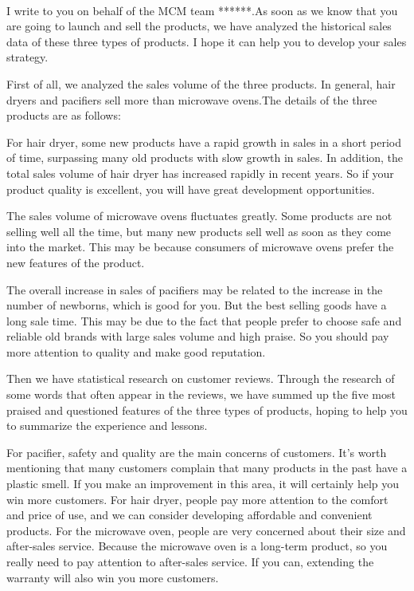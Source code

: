\documentclass{mcmthesis}
\begin{document}
	\paragraph{}
	I write to you on behalf of the MCM team ******.As soon as we know that you are going to launch and sell the products, we have analyzed the historical sales data of these three types of products. I hope it can help you to develop your sales strategy.
	
	First of all, we analyzed the sales volume of the three products. 
	In general, hair dryers and pacifiers sell more than microwave ovens.The details of the three products are as follows:
	
	For hair dryer, some new products have a rapid growth in sales in a short period of time, surpassing many old products with slow growth in sales. In addition, the total sales volume of hair dryer has increased rapidly in recent years. So if your product quality is excellent, you will have great development opportunities. 
	
	The sales volume of microwave ovens fluctuates greatly. Some products are not selling well all the time, but many new products sell well as soon as they come into the market. This may be because consumers of microwave ovens prefer the new features of the product.
	
	The overall increase in sales of pacifiers may be related to the increase in the number of newborns, which is good for you. But the best selling goods have a long sale time. This may be due to the fact that people prefer to choose safe and reliable old brands with large sales volume and high praise. So you should pay more attention to quality and make good reputation.
	
	Then we have statistical research on customer reviews. Through the research of some words that often appear in the reviews, we have summed up the five most praised and questioned features of the three types of products, hoping to help you to summarize the experience and lessons.
	
	For pacifier, safety and quality are the main concerns of customers. It's worth mentioning that many customers complain that many products in the past have a plastic smell. If you make an improvement in this area, it will certainly help you win more customers. For hair dryer, people pay more attention to the comfort and price of use, and we can consider developing affordable and convenient products. For the microwave oven, people are very concerned about their size and after-sales service. Because the microwave oven is a long-term product, so you really need to pay attention to after-sales service. If you can, extending the warranty will also win you more customers.
\end{document}

